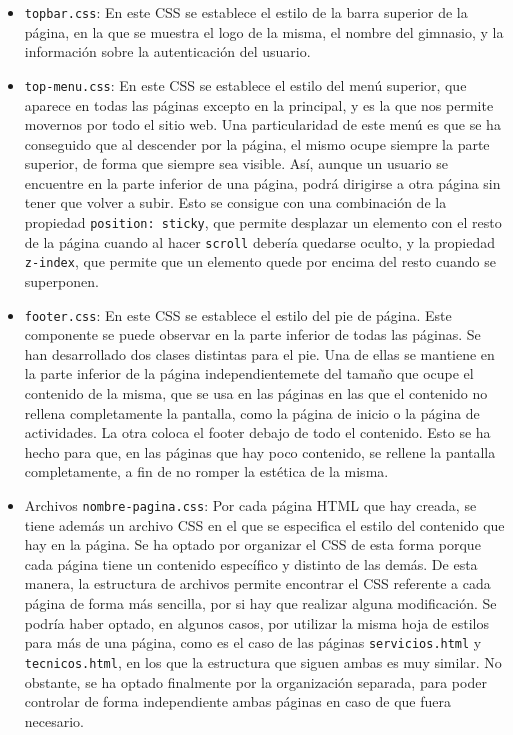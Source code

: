 \documentclass[11pt]{article}
\theoremstyle{plain}
\theoremstyle{definition}
\begin{document}
\begin{itemize}
\item \texttt{topbar.css}: En este CSS se establece el estilo de la
  barra superior de la página, en la que se muestra el logo de la
  misma, el nombre del gimnasio, y la información sobre la
  autenticación del usuario.
\item \texttt{top-menu.css}: En este CSS se establece el estilo del
  menú superior, que aparece en todas las páginas excepto en la
  principal, y es la que nos permite movernos por todo el sitio
  web. Una particularidad de este menú es que se ha conseguido que al
  descender por la página, el mismo ocupe siempre la parte superior,
  de forma que siempre sea visible.  Así, aunque un usuario se
  encuentre en la parte inferior de una página, podrá dirigirse a otra
  página sin tener que volver a subir. Esto se consigue con una
  combinación de la propiedad \texttt{position: sticky}, que permite
  desplazar un elemento con el resto de la página cuando al hacer
  \texttt{scroll} debería quedarse oculto, y la propiedad
  \texttt{z-index}, que permite que un elemento quede por encima del
  resto cuando se superponen.
\item \texttt{footer.css}: En este CSS se establece el estilo del pie
  de página. Este componente se puede observar en la parte inferior de
  todas las páginas. Se han desarrollado dos clases distintas para el
  pie. Una de ellas se mantiene en la parte inferior de la página
  independientemete del tamaño que ocupe el contenido de la misma, que
  se usa en las páginas en las que el contenido no rellena
  completamente la pantalla, como la página de inicio o la página de
  actividades. La otra coloca el footer debajo de todo el
  contenido. Esto se ha hecho para que, en las páginas que hay poco
  contenido, se rellene la pantalla completamente, a fin de no romper
  la estética de la misma.
\item Archivos \texttt{nombre-pagina.css}: Por cada página HTML que
  hay creada, se tiene además un archivo CSS en el que se especifica
  el estilo del contenido que hay en la página. Se ha optado por
  organizar el CSS de esta forma porque cada página tiene un contenido
  específico y distinto de las demás. De esta manera, la estructura de
  archivos permite encontrar el CSS referente a cada página de forma
  más sencilla, por si hay que realizar alguna modificación. Se podría
  haber optado, en algunos casos, por utilizar la misma hoja de
  estilos para más de una página, como es el caso de las páginas
  \texttt{servicios.html} y \texttt{tecnicos.html}, en los que la
  estructura que siguen ambas es muy similar. No obstante, se ha
  optado finalmente por la organización separada, para poder controlar
  de forma independiente ambas páginas en caso de que fuera necesario.
\end{itemize}
\end{document}
